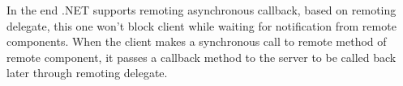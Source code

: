 In the end .NET supports remoting asynchronous callback, based on remoting delegate, this one won't block client while waiting for notification from remote components.
When the client makes a synchronous call to remote method of remote component, it passes a callback method to the server to be called back later through remoting delegate.


